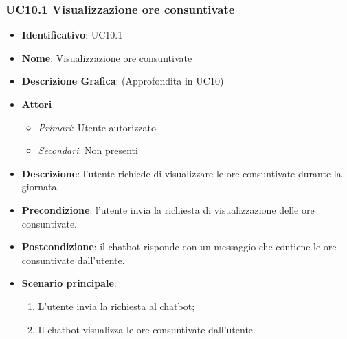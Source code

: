 \subsubsection{UC10.1 Visualizzazione ore consuntivate}
\begin{itemize}
	\item \textbf{Identificativo}: UC10.1
	\item \textbf{Nome}: Visualizzazione ore consuntivate
	\item \textbf{Descrizione Grafica}: (Approfondita in UC10)
	\item \textbf{Attori}
	\begin{itemize}
		\item \textit{Primari}: Utente autorizzato
		\item \textit{Secondari}: Non presenti
	\end{itemize}
	\item \textbf{Descrizione}: l'utente richiede di visualizzare le ore consuntivate durante la giornata.
	\item \textbf{Precondizione}: l'utente invia la richiesta di visualizzazione delle ore consuntivate.
	\item \textbf{Postcondizione}: il chatbot risponde con un messaggio che contiene le ore consuntivate dall'utente.
	\item \textbf{Scenario principale}: 
	\begin{enumerate}
		\item L'utente invia la richiesta al chatbot;
		\item Il chatbot visualizza le ore consuntivate dall'utente.
	\end{enumerate}
\end{itemize}


